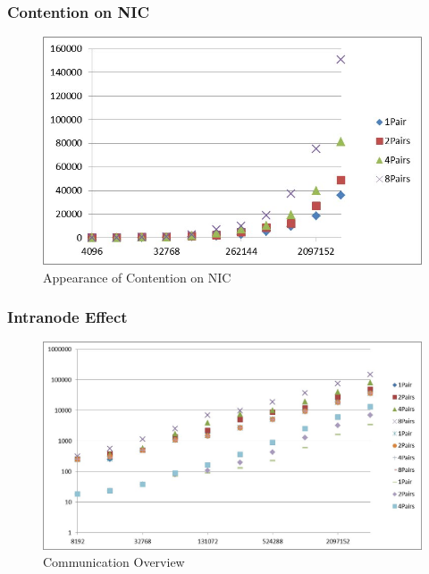 \documentclass{beamer}
\begin{document}
\begin{frame}
\frametitle{Contention on NIC}

\begin{figure}
\includegraphics[width=\linewidth,height=\textheight,keepaspectratio]{image003.jpg}
\caption {Appearance of Contention on NIC}
\end{figure}

\end{frame}
\begin{frame}
\frametitle{Intranode Effect}

\begin{figure}
\includegraphics[width=\linewidth,height=\textheight,keepaspectratio]{image001.jpg}
\caption {Communication Overview}
\end{figure}

\end{frame}
\end{document}
